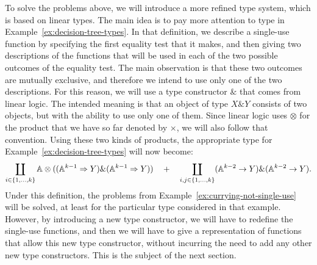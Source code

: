 To solve the problems above, we will introduce a more refined type system, which is based on linear types.  The main idea is to pay more attention to type  in Example~\ref{ex:decision-tree-types}. In that definition, we describe a single-use function by specifying the first equality test that it makes, and then giving two descriptions of the functions that will be used in each of the two possible outcomes of the equality test. The main observation is that these two outcomes are mutually exclusive, and therefore we intend to use only one of the two descriptions. For this reason, we will use a  type constructor $\&$ that comes from linear logic. The intended meaning is  that an object of type $X \& Y$ consists of two objects, but with the ability to use only one of them. Since linear logic uses $\otimes$  for the  product that we have so far denoted by $\times$, we will also follow that convention. Using these two kinds of products, the appropriate type for Example~\ref{ex:decision-tree-types} will now become:
\begin{align*}
\coprod_{i \in \{1,\ldots,k\}} 
        \mathbb A \otimes ((\mathbb A^{k-1} \Rightarrow Y) \& (\mathbb A^{k-1} \Rightarrow Y))
          \quad + \quad 
    \coprod_{i, j \in \{1,\ldots,k\}} (\mathbb A^{k-2} \to Y) \& (\mathbb A^{k-2} \to Y).
    \end{align*}
Under this definition, the problems from Example~\ref{ex:currying-not-single-use} will be solved, at least for the particular type considered in that example. However, by introducing a new type constructor, we will have to redefine the single-use functions, and then we will have to give a representation of functions that allow this new type constructor, without incurring the need to add any other new type constructors. This is the subject of the next section.

